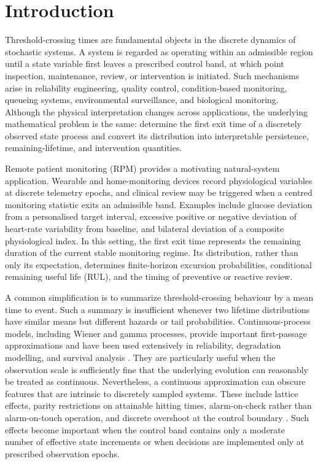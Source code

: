 \documentclass[pdflatex,sn-mathphys-num]{sn-jnl}
\theoremstyle{definition}
\numberwithin{equation}{section}
\begin{document}
\section{Introduction}
\label{sec:introduction}

Threshold-crossing times are fundamental objects in the discrete dynamics of
stochastic systems. A system is regarded as operating within an admissible
region until a state variable first leaves a prescribed control band, at which
point inspection, maintenance, review, or intervention is initiated. Such
mechanisms arise in reliability engineering, quality control,
condition-based monitoring, queueing systems, environmental surveillance, and
biological monitoring. Although the physical interpretation changes across
applications, the underlying mathematical problem is the same: determine the
first exit time of a discretely observed state process and convert its
distribution into interpretable persistence, remaining-lifetime, and
intervention quantities.

Remote patient monitoring (RPM) provides a motivating natural-system
application. Wearable and home-monitoring devices record physiological
variables at discrete telemetry epochs, and clinical review may be triggered
when a centred monitoring statistic exits an admissible band. Examples include
glucose deviation from a personalised target interval, excessive positive or
negative deviation of heart-rate variability from baseline, and bilateral
deviation of a composite physiological index. In this setting, the first exit
time represents the remaining duration of the current stable monitoring
regime. Its distribution, rather than only its expectation, determines
finite-horizon excursion probabilities, conditional remaining useful life
(RUL), and the timing of preventive or reactive review.

A common simplification is to summarize threshold-crossing behaviour by a mean
time to event. Such a summary is insufficient whenever two lifetime
distributions have similar means but different hazards or tail probabilities.
Continuous-process models, including Wiener and gamma processes, provide
important first-passage approximations and have been used extensively in
reliability, degradation modelling, and survival analysis
\cite{van2009survey,karatzas2014brownian,le2016brownian,
steele2001stochastic,baudoin2014diffusion,shreve2004stochastic,
schilling2014brownian,lewis1989gamma,singpurwalla1997gamma,
edirisinghe2013application}. They are particularly useful when the observation
scale is sufficiently fine that the underlying evolution can reasonably be
treated as continuous. Nevertheless, a continuous approximation can obscure
features that are intrinsic to discretely sampled systems. These include
lattice effects, parity restrictions on attainable hitting times, alarm-on-check
rather than alarm-on-touch operation, and discrete overshoot at the control
boundary \cite{broadie1997continuity,wang2025analysis}. Such effects become
important when the control band contains only a moderate number of effective
state increments or when decisions are implemented only at prescribed
observation epochs.
\end{document}
